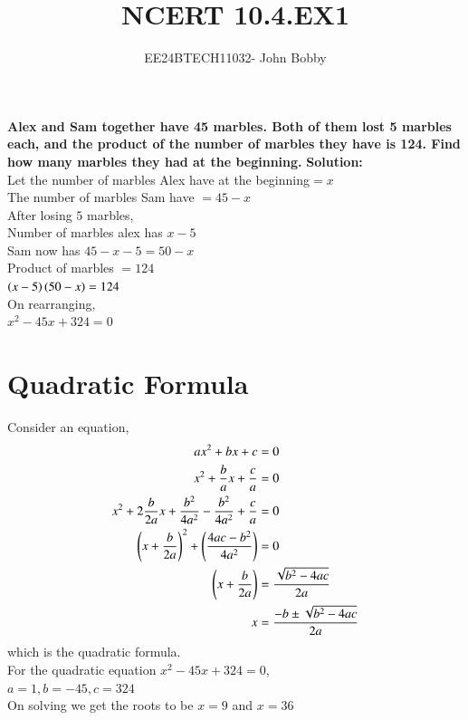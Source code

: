 \documentclass[journal,12pt,onecolumn]{IEEEtran}
\theoremstyle{remark}
\begin{document}

\vspace{3cm}

\title{\textbf{NCERT 10.4.EX1}}
\author{EE24BTECH11032- John Bobby}
\maketitle
\bigskip
\textbf{Alex and Sam together have 45 marbles. Both of them lost 5 marbles each, and the product of the number of marbles they have is 124. Find how many marbles they had at the beginning.}
\textbf{Solution:}\\
Let  the number of marbles Alex have at the beginning$=x$\\
The number of marbles Sam have $=45-x$\\
After losing $5$ marbles,\\
Number of marbles alex has $x-5$\\
Sam now has $45-x-5=50-x$\\
Product of marbles $=124$\\
$\left(x-5\right)\left(50-x\right)=124$\\
On rearranging,\\
$x^2-45x+324=0$
\section{Quadratic Formula}
Consider an equation, 
	\begin{align}
		ax^2 + bx + c &= 0 \\
	        x^2 + \frac{b}{a} x + \frac{c}{a} &= 0 \label{eq:qe} \\
		x^2 + 2 \frac{b}{2a} x + \frac{b^2}{4a^2} - \frac{b^2}{4a^2} + \frac{c}{a} &= 0 \\
		\left(x + \frac{b}{2a}\right)^2 + \left(\frac{4ac - b^2}{4a^2}\right) &= 0 \\
		\left(x + \frac{b}{2a}\right) &= \frac{\sqrt{b^2 - 4ac}}{2a} \\
		x &= \frac{-b \pm \sqrt{b^2 - 4ac}}{2a}
	\end{align}
	which is the quadratic formula. \\
For the quadratic equation $x^2-45x+324=0$,\\
$a=1,b=-45,c=324$\\
On solving we get the roots to be $x=9$ and $x=36$
\end{document}
